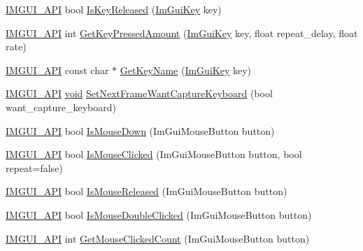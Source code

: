 \begin{DoxyCompactItemize}
\item 
\hyperlink{imgui_8h_a43829975e84e45d1149597467a14bbf5}{I\+M\+G\+U\+I\+\_\+\+A\+PI} bool \hyperlink{namespaceImGui_af37007f6f7296f056590b1ca54796f56}{Is\+Key\+Released} (\hyperlink{imgui_8h_aa22ffe36b188427d712447ec465203d4}{Im\+Gui\+Key} key)
\item 
\hyperlink{imgui_8h_a43829975e84e45d1149597467a14bbf5}{I\+M\+G\+U\+I\+\_\+\+A\+PI} int \hyperlink{namespaceImGui_a48359a9849c1cb2af8fb30c655cf8ff5}{Get\+Key\+Pressed\+Amount} (\hyperlink{imgui_8h_aa22ffe36b188427d712447ec465203d4}{Im\+Gui\+Key} key, float repeat\+\_\+delay, float rate)
\item 
\hyperlink{imgui_8h_a43829975e84e45d1149597467a14bbf5}{I\+M\+G\+U\+I\+\_\+\+A\+PI} const char $\ast$ \hyperlink{namespaceImGui_a1d631e0e344472fb2da1a53a6bf55448}{Get\+Key\+Name} (\hyperlink{imgui_8h_aa22ffe36b188427d712447ec465203d4}{Im\+Gui\+Key} key)
\item 
\hyperlink{imgui_8h_a43829975e84e45d1149597467a14bbf5}{I\+M\+G\+U\+I\+\_\+\+A\+PI} \hyperlink{imgui__impl__opengl3__loader_8h_ac668e7cffd9e2e9cfee428b9b2f34fa7}{void} \hyperlink{namespaceImGui_ac1b2639c15a22180748c792aff2a7e60}{Set\+Next\+Frame\+Want\+Capture\+Keyboard} (bool want\+\_\+capture\+\_\+keyboard)
\item 
\hyperlink{imgui_8h_a43829975e84e45d1149597467a14bbf5}{I\+M\+G\+U\+I\+\_\+\+A\+PI} bool \hyperlink{namespaceImGui_aed7dae248aa865bf06c1d60c0e809537}{Is\+Mouse\+Down} (Im\+Gui\+Mouse\+Button button)
\item 
\hyperlink{imgui_8h_a43829975e84e45d1149597467a14bbf5}{I\+M\+G\+U\+I\+\_\+\+A\+PI} bool \hyperlink{namespaceImGui_a2d430db9485d0b3d86d51d5436225495}{Is\+Mouse\+Clicked} (Im\+Gui\+Mouse\+Button button, bool repeat=false)
\item 
\hyperlink{imgui_8h_a43829975e84e45d1149597467a14bbf5}{I\+M\+G\+U\+I\+\_\+\+A\+PI} bool \hyperlink{namespaceImGui_ae53a0c1818d2804e3b1331f0c1777434}{Is\+Mouse\+Released} (Im\+Gui\+Mouse\+Button button)
\item 
\hyperlink{imgui_8h_a43829975e84e45d1149597467a14bbf5}{I\+M\+G\+U\+I\+\_\+\+A\+PI} bool \hyperlink{namespaceImGui_a2cc28f85bd97eecf708ce78c11761fb9}{Is\+Mouse\+Double\+Clicked} (Im\+Gui\+Mouse\+Button button)
\item 
\hyperlink{imgui_8h_a43829975e84e45d1149597467a14bbf5}{I\+M\+G\+U\+I\+\_\+\+A\+PI} int \hyperlink{namespaceImGui_afff5701c54fdd2c5653ed43e6b5cde1e}{Get\+Mouse\+Clicked\+Count} (Im\+Gui\+Mouse\+Button button)
\item 

\end{DoxyCompactItemize}
